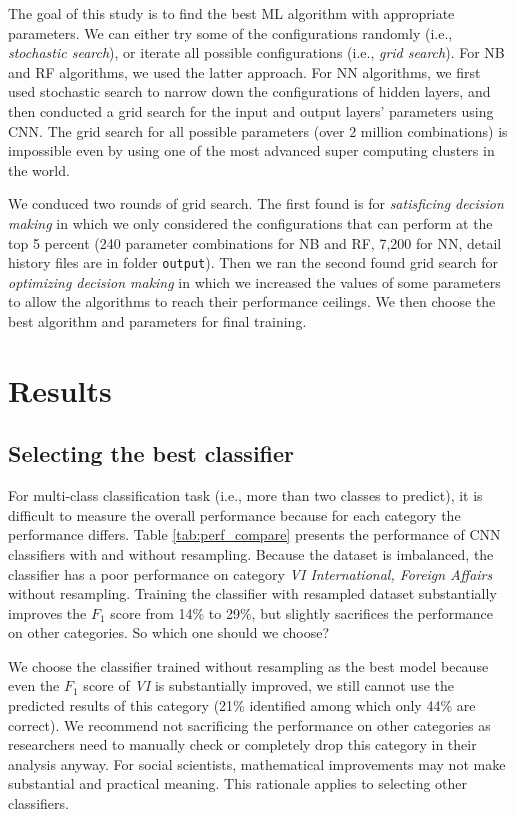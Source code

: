 \documentclass[11pt]{article}
\begin{document}
The goal of this study is to find the best ML algorithm with appropriate parameters. We can either try some of the configurations randomly (i.e., \textit{stochastic search}), or iterate all possible configurations (i.e., \textit{grid search}). For NB and RF algorithms, we used the latter approach. For NN algorithms, we first used stochastic search to narrow down the configurations of hidden layers, and then conducted a grid search for the input and output layers' parameters using CNN. The grid search for all possible parameters (over 2 million combinations) is impossible even by using one of the most advanced super computing clusters in the world.

We conduced two rounds of grid search. The first found is for \textit{satisficing decision making} in which we only considered the configurations that can perform at the top 5 percent (240 parameter combinations for NB and RF, 7,200 for NN, detail history files are in folder \texttt{output}). Then we ran the second found grid search for \textit{optimizing decision making} in which we increased the values of some parameters to allow the algorithms to reach their performance ceilings. We then choose the best algorithm and parameters for final training.


\section{Results}


\subsection{Selecting the best classifier}

For multi-class classification task (i.e., more than two classes to predict), it is difficult to measure the overall performance because for each category the performance differs. Table \ref{tab:perf_compare} presents the performance of CNN classifiers with and without resampling. Because the dataset is imbalanced, the classifier has a poor performance on category \textit{VI International, Foreign Affairs} without resampling. Training the classifier with resampled dataset substantially improves the $F_1$ score from 14\% to 29\%, but slightly sacrifices the performance on other categories. So which one should we choose?

We choose the classifier trained without resampling as the best model because even the $F_1$ score of \textit{VI} is substantially improved, we still cannot use the predicted results of this category (21\% identified among which only 44\% are correct). We recommend not sacrificing the performance on other categories as researchers need to manually check or completely drop this category in their analysis anyway. For social scientists, mathematical improvements may not make substantial and practical meaning. This rationale applies to selecting other classifiers.
\end{document}
